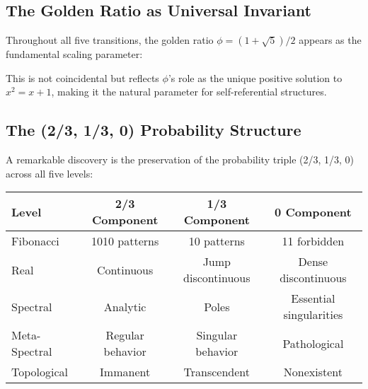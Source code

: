 \documentclass[12pt]{article}
\theoremstyle{plain}
\theoremstyle{definition}
\begin{document}
\subsection{The Golden Ratio as Universal Invariant}

Throughout all five transitions, the golden ratio $\phi = (1+\sqrt{5})/2$ appears as the fundamental scaling parameter:

\begin{center}
\end{center}

This is not coincidental but reflects $\phi$'s role as the unique positive solution to $x^2 = x + 1$, making it the natural parameter for self-referential structures.

\subsection{The (2/3, 1/3, 0) Probability Structure}

A remarkable discovery is the preservation of the probability triple (2/3, 1/3, 0) across all five levels:

\begin{center}
\renewcommand{\arraystretch}{1.5}
\begin{tabular}{|l|c|c|c|}
\hline
\textbf{Level} & \textbf{2/3 Component} & \textbf{1/3 Component} & \textbf{0 Component} \\
\hline
Fibonacci & 1010 patterns & 10 patterns & 11 forbidden \\
Real & Continuous & Jump discontinuous & Dense discontinuous \\
Spectral & Analytic & Poles & Essential singularities \\
Meta-Spectral & Regular behavior & Singular behavior & Pathological \\
Topological & Immanent & Transcendent & Nonexistent \\
\hline
\end{tabular}
\end{center}
\end{document}
